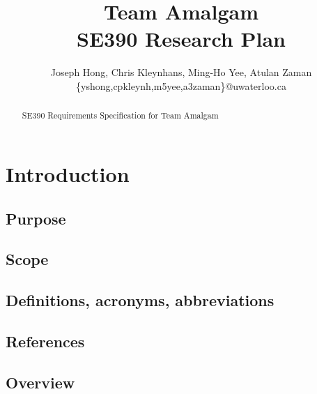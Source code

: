 \documentclass[11pt]{article}
\title{{\Large Team Amalgam} \\ SE390 Research Plan}
\author{Joseph Hong, Chris Kleynhans, Ming-Ho Yee, Atulan Zaman \\
        \{yshong,cpkleynh,m5yee,a3zaman\}@uwaterloo.ca}
\begin{document}
\maketitle

\begin{abstract}
SE390 Requirements Specification for Team Amalgam
\end{abstract}

\tableofcontents
\newpage

\section{Introduction} %
\subsection{Purpose}

\subsection{Scope}

\subsection{Definitions, acronyms, abbreviations}

\subsection{References}

\subsection{Overview}
\end{document}
